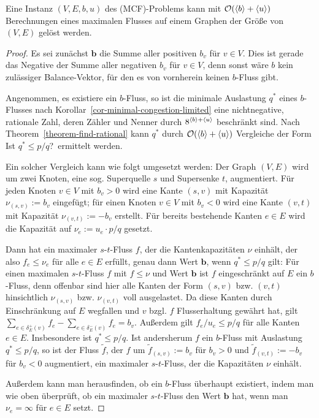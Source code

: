 \begin{theorem}
	Eine Instanz $(V,E,b,u)$ des (MCF)-Problems kann mit $\mathcal{O}(\langle b\rangle + \langle u\rangle)$ Berechnungen eines maximalen Flusses auf einem Graphen der Größe von $(V,E)$ gelöst werden.
\end{theorem}
\begin{proof}
	Es sei zunächst $\mathbf{b}$ die Summe aller positiven $b_v$ für $v\in V$.
	Dies ist gerade das Negative der Summe aller negativen $b_v$ für $v\in V$, denn sonst wäre $b$ kein zulässiger Balance-Vektor, für den es von vornherein keinen $b$-Fluss gibt.
	
	Angenommen, es existiere ein $b$-Fluss, so ist die minimale Auslastung $q^*$ eines $b$-Flusses nach Korollar~\ref{cor-minimal-congestion-limited} eine nichtnegative, rationale Zahl, deren Zähler und Nenner durch $8^{\langle b\rangle + \langle u\rangle}$ beschränkt sind.
	Nach Theorem~\ref{theorem-find-rational} kann $q^*$ durch $\mathcal{O}(\langle b\rangle + \langle u\rangle)$ Vergleiche der Form \glqq Ist $q^*\leq p/q$?\grqq\ ermittelt werden.
	
	Ein solcher Vergleich kann wie folgt umgesetzt werden:
	Der Graph $(V,E)$ wird um zwei Knoten, eine sog. Superquelle $s$ und Supersenke $t$, augmentiert.
	Für jeden Knoten $v\in V$ mit $b_v > 0$ wird eine Kante $(s,v)$ mit Kapazität $\nu_{(s,v)}:= b_v$ eingefügt; für einen Knoten $v\in V$ mit $b_v < 0$ wird eine Kante $(v,t)$ mit Kapazität $\nu_{(v,t)}:= -b_v$ erstellt.
	Für bereits bestehende Kanten $e\in E$ wird die Kapazität auf $\nu_e := u_e \cdot  p / q$ gesetzt.
	
	Dann hat ein maximaler $s$-$t$-Fluss $f$, der die Kantenkapazitäten $\nu$  einhält, der also $f_e\leq \nu_e$ für alle $e\in E$ erfüllt, genau dann Wert $\mathbf{b}$, wenn $q^*\leq p/q$ gilt:
	Für einen maximalen $s$-$t$-Fluss $f$ mit $f\leq \nu$ und Wert $\mathbf{b}$ ist $f$ eingeschränkt auf $E$ ein $b$-Fluss, denn offenbar sind hier alle Kanten der Form $(s,v)$ bzw. $(v,t)$ hinsichtlich $\nu_{(s,v)}$ bzw. $\nu_{(v,t)}$ voll ausgelastet.	
	Da diese Kanten durch Einschränkung auf $E$ wegfallen und $v$ bzgl. $f$ Flusserhaltung gewährt hat, gilt $\sum_{e\in\delta^+_E(v)} f_e - \sum_{e\in\delta^-_E(v)} f_e = b_v$.
	Außerdem gilt $f_e/u_e \leq p/q$ für alle Kanten $e\in E$.
	Insbesondere ist $q^*\leq p/q$.
	Ist andersherum $f$ ein $b$-Fluss mit Auslastung $q^*\leq p/q$, so ist der Fluss $\tilde{f}$, der $f$ um $\tilde{f}_{(s,v)}:=b_v$ für $b_v > 0$ und $\tilde{f}_{(v,t)}:= -b_v$ für $b_v < 0$ augmentiert, ein maximaler $s$-$t$-Fluss, der die Kapazitäten $\nu$ einhält.
	
	Außerdem kann man herausfinden, ob ein $b$-Fluss überhaupt existiert, indem man wie oben überprüft, ob ein maximaler $s$-$t$-Fluss den Wert $\mathbf{b}$ hat, wenn man $\nu_e=\infty$ für $e\in E$ setzt.
\end{proof}

